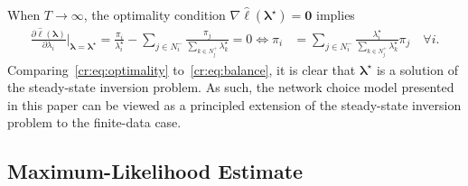 When $T \to \infty$, the optimality condition $\nabla \hat{\ell} (\bm{\lambda}^\star) = \bm{0}$ implies
\begin{align}
\frac{\partial \hat{\ell}(\bm{\lambda})}{\partial \lambda_i} \bigg|_{\bm{\lambda} = \bm{\lambda}^\star}
    = \frac{\pi_i}{\lambda^\star_i} - \sum_{j \in N^-_i} \frac{\pi_j}{\sum_{k \in N^+_j} \lambda^\star_k} = 0
    \iff \pi_i &= \sum_{j \in N^-_i} \frac{\lambda^\star_i}{\sum_{k \in N^+_j} \lambda^\star_k} \pi_j \quad \forall i. \label{cr:eq:optimality}
\end{align}
Comparing~\eqref{cr:eq:optimality} to~\eqref{cr:eq:balance}, it is clear that $\bm{\lambda}^\star$ is a solution of the steady-state inversion problem.
As such, the network choice model presented in this paper can be viewed as a principled extension of the steady-state inversion problem to the finite-data case.


\subsection{Maximum-Likelihood Estimate}
\label{cr:sec:maxlik}

